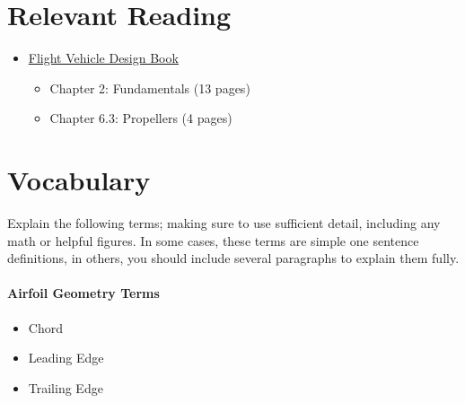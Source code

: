 \documentclass[11pt,twocolumn]{article}
\begin{document}
\section*{Relevant Reading}
\label{sec:reading}

\begin{itemize}
	\item \href{http://flowlab.groups.et.byu.net/me415/flight.pdf}{Flight Vehicle Design Book}
	\begin{itemize}
		\item Chapter 2: Fundamentals (13 pages)
		\item Chapter 6.3: Propellers (4 pages)
	\end{itemize}

\end{itemize}





\section{Vocabulary}
\label{sec:vocab}

Explain the following terms; making sure to use sufficient detail, including any math or helpful figures.
In some cases, these terms are simple one sentence definitions, in others, you should include several paragraphs to explain them fully.

\paragraph{Airfoil Geometry Terms}
\begin{itemize}
	\item Chord
	\item Leading Edge
	\item Trailing Edge
\end{itemize}
\end{document}
